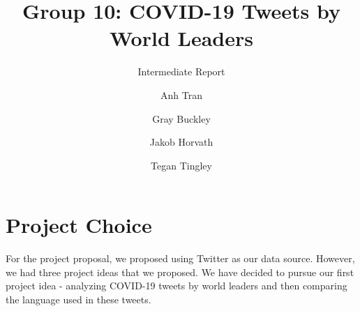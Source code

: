 \documentclass[sigconf]{acmart}
\begin{document}
	
	\title{Group 10: COVID-19 Tweets by World Leaders}
	\subtitle{Intermediate Report}
	
	\author{Anh Tran}
	\author{Gray Buckley}
	\author{Jakob Horvath}
	\author{Tegan Tingley}

	
	
	
	\maketitle
	
	\section{Project Choice}
	For the project proposal, we proposed using Twitter as our data source. However, we had three project ideas that we proposed. We have decided to pursue our first project idea - analyzing COVID-19 tweets by world leaders and then comparing the language used in these tweets.
	
\end{document}
